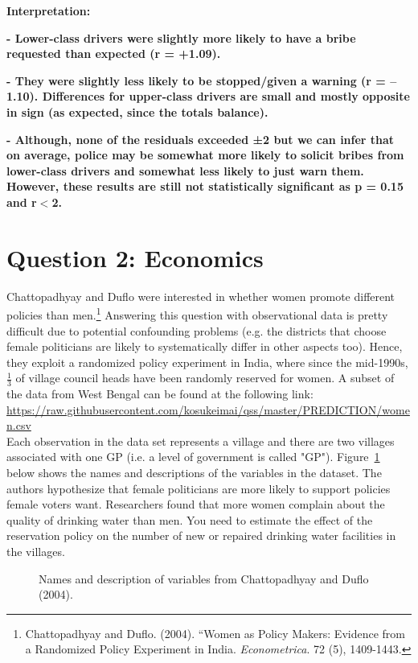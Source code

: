 \documentclass[12pt,letterpaper]{article}
\begin{document}
\begin{enumerate}
	\textbf{Interpretation:}
	
	\textbf{- Lower-class drivers were slightly more likely to have a bribe requested than expected (r = +1.09).}
	
	\textbf{- They were slightly less likely to be stopped/given a warning (r = –1.10).
	Differences for upper-class drivers are small and mostly opposite in sign (as expected, since the totals balance).}
	
	\textbf{- Although, none of the residuals exceeded ±2 but we can infer that on average, police may be somewhat more likely to solicit bribes from lower-class drivers and somewhat less likely to just warn them.
	However, these results are still not statistically significant as p = 0.15 and r$<$2.}
	
\end{enumerate}
\newpage

\section*{Question 2: Economics}
Chattopadhyay and Duflo were interested in whether women promote different policies than men.\footnote{Chattopadhyay and Duflo. (2004). ``Women as Policy Makers: Evidence from a Randomized Policy Experiment in India. \textit{Econometrica}. 72 (5), 1409-1443.} Answering this question with observational data is pretty difficult due to potential confounding problems (e.g. the districts that choose female politicians are likely to systematically differ in other aspects too). Hence, they exploit a randomized policy experiment in India, where since the mid-1990s, $\frac{1}{3}$ of village council heads have been randomly reserved for women. A subset of the data from West Bengal can be found at the following link: \url{https://raw.githubusercontent.com/kosukeimai/qss/master/PREDICTION/women.csv}\\

\noindent Each observation in the data set represents a village and there are two villages associated with one GP (i.e. a level of government is called "GP"). Figure~\ref{fig:women_desc} below shows the names and descriptions of the variables in the dataset. The authors hypothesize that female politicians are more likely to support policies female voters want. Researchers found that more women complain about the quality of drinking water than men. You need to estimate the effect of the reservation policy on the number of new or repaired drinking water facilities in the villages.
\vspace{.5cm}
\begin{figure}[h!]
	\caption{\footnotesize{Names and description of variables from Chattopadhyay and Duflo (2004).}}
	\vspace{.5cm}
	\centering
	\label{fig:women_desc}
\end{figure}		
\end{document}
